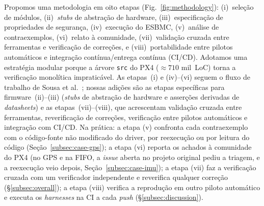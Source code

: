 \documentclass[conference]{IEEEtran}
\begin{document}
Propomos uma metodologia em oito etapas (Fig.~\ref{fig:methodology}):
(i)~seleção de módulos, (ii)~\textit{stubs} de abstração de hardware,
(iii)~especificação de propriedades de segurança, (iv)~execução do
ESBMC, (v)~análise de contraexemplos, (vi)~relato à comunidade,
(vii)~validação cruzada entre ferramentas e verificação de correções,
e (viii)~portabilidade entre pilotos automáticos e integração
contínua/entrega contínua (CI/CD).
Adotamos uma estratégia modular porque a árvore \texttt{src} do PX4
(${\approx}710$ mil~LoC) torna a verificação monolítica impraticável.
As etapas~(i) e (iv)--(vi) seguem o fluxo de trabalho de
Sousa et al.~\cite{Sousa2026}; nossas adições são as etapas
específicas para firmware~(ii)--(iii) (\textit{stubs} de abstração de
hardware e asserções derivadas de \textit{datasheets}) e as
etapas~(vii)--(viii), que acrescentam validação cruzada entre
ferramentas, reverificação de correções, verificação entre pilotos
automáticos e integração com CI/CD.
Na prática: a etapa (v) confronta cada contraexemplo com o código-fonte
não modificado do driver, por reexecução ou por leitura do código
(Seção~\ref{subsec:case-gps}); a etapa (vi) reporta os achados à
comunidade do PX4 (no GPS e na FIFO, a \textit{issue} aberta no
projeto original pediu a triagem, e a reexecução veio depois,
Seção~\ref{subsec:case-imu}); a etapa (vii) faz a verificação cruzada
com um verificador independente e reverifica qualquer correção
(\S\ref{subsec:overall}); a etapa (viii) verifica a reprodução em
outro piloto automático e executa os \textit{harnesses} na CI a cada
\textit{push} (\S\ref{subsec:discussion}).
\end{document}
